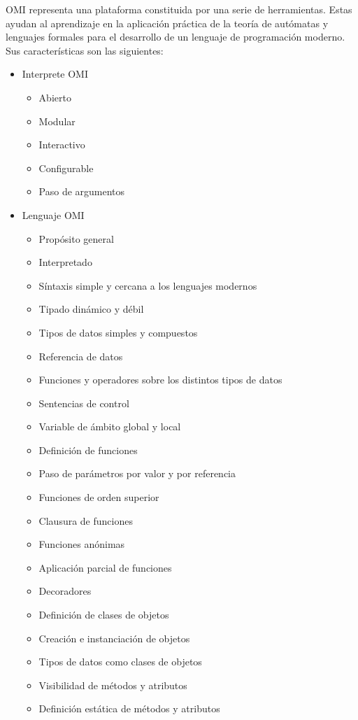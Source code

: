 OMI representa una plataforma constituida por una serie de herramientas. Estas ayudan al aprendizaje en la aplicación práctica de la teoría
de autómatas y lenguajes formales para el desarrollo de un lenguaje de programación moderno. Sus características son las siguientes:

\begin{itemize}
\item Interprete OMI
   \begin {itemize}
   \item Abierto
   \item Modular
   \item Interactivo
   \item Configurable
   \item Paso de argumentos
   \end{itemize}
\item Lenguaje OMI
   \begin {itemize}
   \item Propósito general
   \item Interpretado
   \item Síntaxis simple y cercana a los lenguajes modernos
   \item Tipado dinámico y débil
   \item Tipos de datos simples y compuestos
   \item Referencia de datos
   \item Funciones y operadores sobre los distintos tipos de datos
   \item Sentencias de control 
   \item Variable de ámbito global y local
   \item Definición de funciones
   \item Paso de parámetros por valor y por referencia
   \item Funciones de orden superior
   \item Clausura de funciones
   \item Funciones anónimas
   \item Aplicación parcial de funciones
   \item Decoradores
   \item Definición de clases de objetos
   \item Creación e instanciación de objetos
   \item Tipos de datos como clases de objetos
   \item Visibilidad de métodos y atributos
   \item Definición estática de métodos y atributos

\end{itemize}
\end{itemize}
